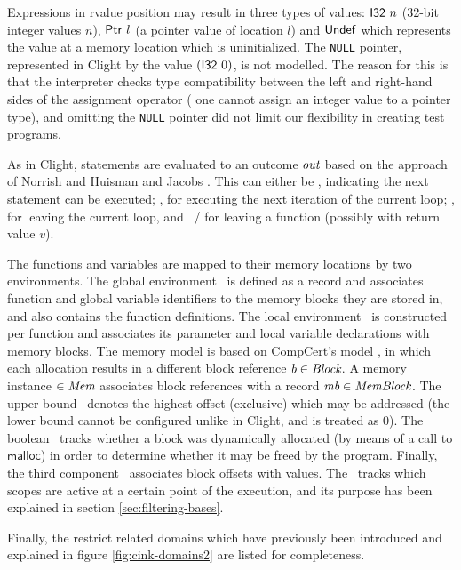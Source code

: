 Expressions in rvalue position may result in three types of values: $\mathsf{I32} \ n$ (32-bit integer values 
$n$), $\mathsf{Ptr} \ l$ (a pointer value of location $l$) and $\mathsf{Undef}$ which represents the value at a memory location
which is uninitialized.
The \texttt{NULL} pointer, represented in Clight by the value $(\mathsf{I32} \ 0)$, is not modelled.
The reason for this is that the interpreter checks type compatibility between the left and right-hand sides of the assignment operator (\ie
one cannot assign an integer value to a pointer type), and omitting the \texttt{NULL} pointer did not limit our flexibility in creating test programs.

As in Clight, statements are evaluated to an outcome $\textit{out}$ based on the approach of Norrish \cite{norrish1998c} and Huisman and Jacobs \cite{huisman2000java}.
This can either be \onormal, indicating the next statement can be executed; \ocontinue, for executing the next iteration of the current loop;
\obreak, for leaving the current loop, and \oreturn \ /  for leaving a function (possibly with return value $v$).

The functions and variables are mapped to their memory locations by two environments.
The global environment \Globalsvar \ is defined as a record and associates function and global variable identifiers
to the memory blocks they are stored in, and also contains the function definitions.
The local environment \Envvar \ is constructed per function and associates its parameter 
and local variable declarations with memory blocks.
The memory model is based on CompCert's model \cite{leroy2012compcert}, in which each allocation
results in a different block reference $\textit{b} \in \textit{Block}$.
A memory instance \Memvar $\in \textit{Mem}$ associates block references with a record $\textit{mb} \in \textit{MemBlock}$.
The upper bound \Memblockmemberhi \ denotes the highest offset (exclusive) which may be addressed (the lower bound cannot be configured unlike in Clight, and is treated as 0).
The boolean \Memblockmemberdyn \ tracks whether a block was dynamically allocated (by means of a call to $\mathsf{malloc}$)
in order to determine whether it may be freed by the program.
Finally, the third component \Memblockmembercontent \ associates block offsets with values.
The \Scopemap \ tracks which scopes are active at a certain point of the execution,
and its purpose has been explained in section \ref{sec:filtering-bases}.

Finally, the restrict related domains which have previously been
introduced and explained in figure \ref{fig:cink-domains2} are listed for completeness.

